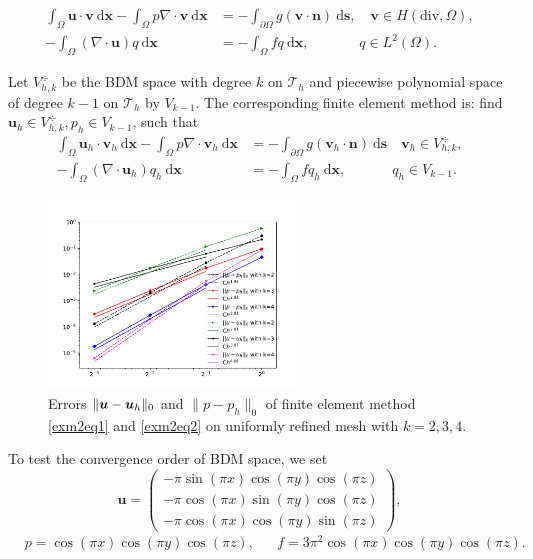 \documentclass[mathpazo]{cicp}
\begin{document}
\begin{align*}
  \int_{\Omega} \boldsymbol u \cdot \boldsymbol v \ \mathrm d\boldsymbol x -
  \int_{\Omega} p\nabla \cdot \boldsymbol v \ \mathrm d\boldsymbol x & =
  -\int_{\partial \Omega} g(\boldsymbol v \cdot \boldsymbol n) \
  \mathrm d\boldsymbol s, \quad \boldsymbol v \in H(\mathrm{div}, \Omega),\\
  -\int_{\Omega} (\nabla \cdot \boldsymbol u) q \ \mathrm d\boldsymbol x & =
  -\int_{\Omega} fq \ \mathrm d\boldsymbol x, \qquad\quad\;\;  q \in L^2(\Omega).
\end{align*}

Let $V_{h,k}^{\div}$ be the BDM space with degree $k$ on $\mathcal T_h$ and
piecewise polynomial space of degree $k-1$ on $\mathcal T_h$ by $V_{k-1}$.  
The corresponding finite element method is: find 
$\boldsymbol u_h \in V_{h,k}^{\div}, p_h \in V_{k-1}$, such that
\begin{align}
  \int_{\Omega} \boldsymbol u_h \cdot \boldsymbol v_h \ \mathrm d\boldsymbol x -
  \int_{\Omega} p\nabla \cdot \boldsymbol v_h \ \mathrm d\boldsymbol x & =
  -\int_{\partial \Omega} g(\boldsymbol v_h \cdot \boldsymbol n) \
  \mathrm d\boldsymbol s \quad  \boldsymbol v_h \in V_{h,k}^{\div},\label{exm2eq1}\\
  -\int_{\Omega} (\nabla \cdot \boldsymbol u_h) q_h \ \mathrm d\boldsymbol x &=
  -\int_{\Omega} fq_h \ \mathrm d\boldsymbol x, \qquad\quad\;  q_h \in V_{k-1}.\label{exm2eq2}
\end{align}


\begin{figure}[htp]
\centering
\includegraphics[width=0.6\textwidth]{figures/poisson.pdf}
\caption{Errors $\|\boldsymbol u - \boldsymbol u_h\|_0$ and $\|p - p_h\|_0$ of finite element
method \eqref{exm2eq1} and \eqref{exm2eq2} on uniformly refined mesh with $k = 2, 3, 4$.}
\label{exm2fig1}
\end{figure}

To test the convergence order of BDM space, we set
$$
\boldsymbol u = 
\begin{pmatrix}
-\pi\sin(\pi x)\cos(\pi y)\cos(\pi z)\\ 
-\pi\cos(\pi x)\sin(\pi y)\cos(\pi z)\\
-\pi\cos(\pi x)\cos(\pi y)\sin(\pi z)
\end{pmatrix},
$$
\begin{align*}
& p = \cos(\pi x)\cos(\pi y)\cos(\pi z), &  & f = 3\pi^2\cos(\pi x)\cos(\pi y)\cos(\pi z).&
\end{align*}
\end{document}
